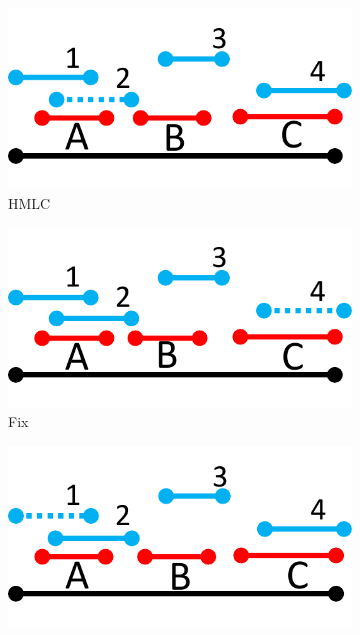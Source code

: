 \documentclass[10pt,journal,compsoc]{IEEEtran}
\begin{document}
\begin{figure}[t]
\centering

  \begin{subfigure}[b]{0.20\textwidth}
   	\includegraphics[width=\textwidth]{figures/Matching/HMLC.pdf}
    \caption{HMLC\label{fig:HMLCM}}
   \end{subfigure} \hspace{6ex}
     \begin{subfigure}[b]{0.20\textwidth}
   	\includegraphics[width=\textwidth]{figures/Matching/Fix.pdf}
        \caption{Fix\label{fig:FixM}}
   \end{subfigure}\hspace{6ex}
  \begin{subfigure}[b]{0.20\textwidth}
   	\includegraphics[width=\textwidth]{figures/Matching/Greedy.pdf}

\end{subfigure}
\end{figure}
\end{document}
